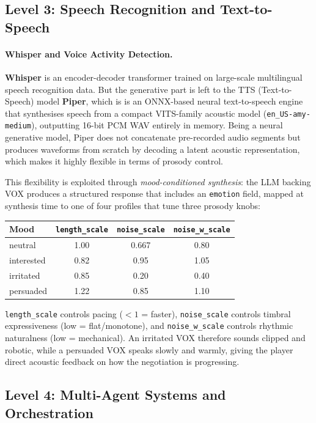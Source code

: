 \documentclass[11pt,a4paper]{article}
\begin{document}
\subsection{Level 3: Speech Recognition and Text-to-Speech}

\paragraph{Whisper and Voice Activity Detection.}
\textbf{Whisper} is an encoder-decoder transformer trained on large-scale
multilingual speech recognition data. But the generative part is left to the TTS (Text-to-Speech) model \textbf{Piper}, which is is an ONNX-based neural text-to-speech engine that synthesises speech from a compact VITS-family acoustic model (\texttt{en\_US-amy-medium}), outputting 16-bit PCM WAV entirely in memory. Being a neural generative model, Piper does not concatenate pre-recorded audio segments but produces waveforms from scratch by decoding a latent acoustic representation, which makes it highly flexible in terms of prosody control.

This flexibility is exploited through \emph{mood-conditioned synthesis}: the LLM backing VOX produces a structured response that includes an \texttt{emotion} field, mapped at synthesis time to one of four profiles that tune three prosody knobs:

\begin{center}
\begin{tabular}{lccc}
\toprule
\textbf{Mood} & \texttt{length\_scale} & \texttt{noise\_scale} & \texttt{noise\_w\_scale} \\
\midrule
neutral    & 1.00 & 0.667 & 0.80 \\
interested & 0.82 & 0.95  & 1.05 \\
irritated  & 0.85 & 0.20  & 0.40 \\
persuaded  & 1.22 & 0.85  & 1.10 \\
\bottomrule
\end{tabular}
\end{center}

\noindent \texttt{length\_scale} controls pacing ($<1$ = faster), \texttt{noise\_scale} controls timbral expressiveness (low = flat/monotone), and \texttt{noise\_w\_scale} controls rhythmic naturalness (low = mechanical). An irritated VOX therefore sounds clipped and robotic, while a persuaded VOX speaks slowly and warmly, giving the player direct acoustic feedback on how the negotiation is progressing.

\subsection{Level 4: Multi-Agent Systems and Orchestration}
\end{document}
